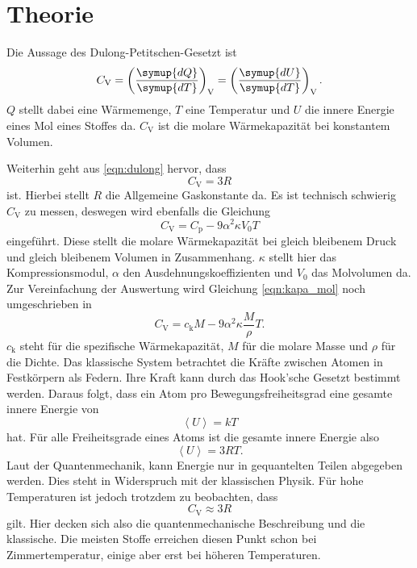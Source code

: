\section{Theorie}
\label{sec:Theorie}

Die Aussage des Dulong-Petitschen-Gesetzt ist
\begin{equation}
    C_\text{V} = \left ( \frac{\symup{dQ}}{\symup{dT}} \right )_\text{V} = \left ( \frac{\symup{dU}}{\symup{dT}} \right )_\text{V}  .
    \label{eqn:dulong}
\end{equation}
$Q$ stellt dabei eine Wärmemenge, $T$ eine Temperatur und $U$ die innere Energie eines Mol eines Stoffes da.
$C_\text{V}$ ist die molare Wärmekapazität bei konstantem Volumen.

Weiterhin geht aus \eqref{eqn:dulong} hervor, dass
\begin{equation}
    C_\text{V} = 3R
    \label{eqn:dulong_klassisch}
\end{equation}
ist. Hierbei stellt $R$ die Allgemeine Gaskonstante da.
Es ist technisch schwierig $C_\text{V}$ zu messen, deswegen wird ebenfalls die Gleichung
\begin{equation}
    C_\text{V} = C_\text{p} - 9 \alpha^2 \kappa V_0 T
    \label{eqn:kapa_mol}
\end{equation}
eingeführt.
Diese stellt die molare Wärmekapazität bei gleich bleibenem Druck und gleich bleibenem Volumen in Zusammenhang.
$\kappa$ stellt hier das Kompressionsmodul, $\alpha$ den Ausdehnungskoeffizienten und $V_0$ das Molvolumen da.
Zur Vereinfachung der Auswertung wird Gleichung \eqref{eqn:kapa_mol} noch umgeschrieben in
\begin{equation}
    C_\text{V} = c_\text{k} M - 9\alpha^2 \kappa \frac{M}{\rho}T.
\end{equation}
$c_\text{k}$ steht für die spezifische Wärmekapazität, $M$ für die molare Masse und $\rho$ für die Dichte.
Das klassische System betrachtet die Kräfte zwischen Atomen in Festkörpern als Federn.
Ihre Kraft kann durch das Hook'sche Gesetzt bestimmt werden.
Daraus folgt, dass ein Atom pro Bewegungsfreiheitsgrad eine gesamte innere Energie von
\begin{equation*}
    \left < U \right > = kT
\end{equation*}
hat.
Für alle Freiheitsgrade eines Atoms ist die gesamte innere Energie also
\begin{equation*}
    \left < U \right > = 3RT.
\end{equation*}
Laut der Quantenmechanik, kann Energie nur in gequantelten Teilen abgegeben werden.
Dies steht in Widerspruch mit der klassischen Physik.
Für hohe Temperaturen ist jedoch trotzdem zu beobachten, dass 
\begin{equation*}
    C_\text{V} \approx 3 R
\end{equation*}
gilt.
Hier decken sich also die quantenmechanische Beschreibung und die klassische.
Die meisten Stoffe erreichen diesen Punkt schon bei Zimmertemperatur, einige aber erst bei höheren Temperaturen.

